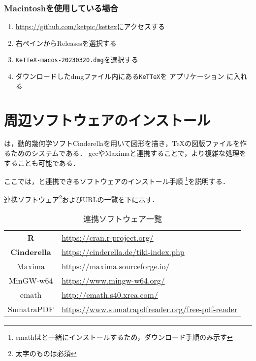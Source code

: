 \subsubsection{Macintoshを使用している場合}
\begin{enumerate}
    \item \url{https://github.com/ketpic/kettex}にアクセスする
    \item 右ペインからReleasesを選択する
    \item \verb|KeTTeX-macos-20230320.dmg|を選択する
    \item ダウンロードしたdmgファイル内にある\verb|KeTTeX|を アプリケーション に入れる
\end{enumerate}

\newpage

\section{周辺ソフトウェアのインストール}

{\ketcindy}は，動的幾何学ソフトCinderellaを用いて図形を描き，{\TeX}の図版ファイルを作るためのシステムである．
gccやMaximaと連携することで，より複雑な処理をすることも可能である．

ここでは，{\ketcindy}と連携できるソフトウェアのインストール手順
\footnote{emathは{\ketcindy}と一緒にインストールするため，ダウンロード手順のみ示す}を説明する．

連携ソフトウェア\footnote{太字のものは必須}およびURLの一覧を下に示す．

\begin{table}[h]
    \centering
    \caption{連携ソフトウェア一覧}
    \label{tab:download}
    \begin{tabular}{c||l}
        \textbf{R}           & \url{https://cran.r-project.org/}\\
        \textbf{Cinderella}  & \url{https://cinderella.de/tiki-index.php}\\
        Maxima      & \url{https://maxima.sourceforge.io/}\\
        MinGW-w64   & \url{https://www.mingw-w64.org/}\\
        emath       & \url{http://emath.s40.xrea.com/}\\
        SumatraPDF  & \url{https://www.sumatrapdfreader.org/free-pdf-reader}
    \end{tabular}
\end{table}

